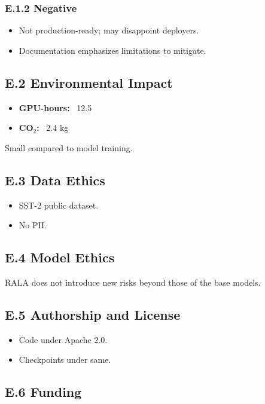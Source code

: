 \subsubsection{E.1.2 Negative}

\begin{itemize}
\item Not production-ready; may disappoint deployers.
\item Documentation emphasizes limitations to mitigate.

\end{itemize}
\subsection{E.2 Environmental Impact}

\begin{itemize}
\item \textbf{GPU-hours:} ~12.5
\item \textbf{CO$_2$:} ~2.4 kg

\end{itemize}
Small compared to model training.

\subsection{E.3 Data Ethics}

\begin{itemize}
\item SST-2 public dataset.
\item No PII.

\end{itemize}
\subsection{E.4 Model Ethics}

RALA does not introduce new risks beyond those of the base models.

\subsection{E.5 Authorship and License}

\begin{itemize}
\item Code under Apache 2.0.
\item Checkpoints under same.

\end{itemize}
\subsection{E.6 Funding}

